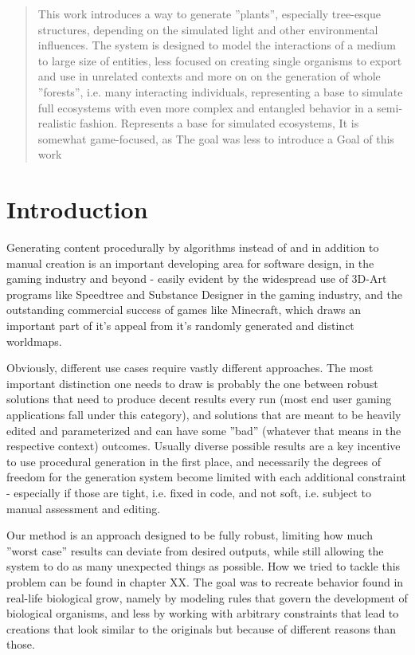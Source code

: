 \documentclass[11pt]{scrartcl}
\begin{document}
\begin{abstract}

This work introduces a way to generate ''plants'', especially tree-esque structures, depending on the simulated light and other environmental influences. The system is designed to model the interactions of a medium to large size of entities, less focused on creating single organisms to export and use in unrelated contexts and more on on the generation of whole ''forests'', i.e. many interacting individuals, representing a base to simulate full ecosystems with even more complex and entangled behavior in a semi-realistic fashion.
Represents a base for simulated ecosystems, 
It is somewhat game-focused, as 
The goal was less to introduce a 
Goal of this work 
\end{abstract}

\section{Introduction}
Generating content procedurally by algorithms instead of and in addition to manual creation is an important developing area for software design, in the gaming industry and beyond - easily evident by the widespread use of 3D-Art programs like Speedtree and Substance Designer in the gaming industry, and the outstanding commercial success of games like Minecraft, which draws an important part of it's appeal from it's randomly generated and distinct worldmaps.

Obviously, different use cases require vastly different approaches. The most important distinction one needs to draw is probably the one between robust solutions that need to produce decent results every run (most end user gaming applications fall under this category), and solutions that are meant to be heavily edited and parameterized and can have some ''bad'' (whatever that means in the respective context) outcomes. Usually diverse possible results are a key incentive to use procedural generation in the first place, and necessarily the degrees of freedom for the generation system become limited with each additional constraint - especially if those are tight, i.e. fixed in code, and not soft, i.e. subject to manual assessment and editing.

Our method is an approach designed to be fully robust, limiting how much ''worst case'' results can deviate from desired outputs, while still allowing the system to do as many unexpected things as possible. How we tried to tackle this problem can be found in chapter XX. The goal was to recreate behavior found in real-life biological grow, namely by modeling rules that govern the development of biological organisms, and less by working with arbitrary constraints that lead to creations that look similar to the originals but because of different reasons than those.
\end{document}

